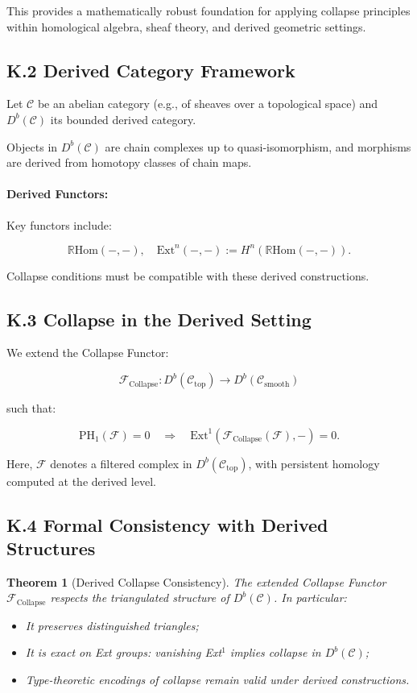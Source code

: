 \documentclass[11pt]{article}
\newtheorem{theorem}{Theorem}[section]
\begin{document}
This provides a mathematically robust foundation for applying collapse principles within homological algebra, sheaf theory, and derived geometric settings.

\subsection*{K.2 Derived Category Framework}

Let \( \mathcal{C} \) be an abelian category (e.g., of sheaves over a topological space) and \( D^b(\mathcal{C}) \) its bounded derived category.

Objects in \( D^b(\mathcal{C}) \) are chain complexes up to quasi-isomorphism, and morphisms are derived from homotopy classes of chain maps.

\paragraph{Derived Functors:}
Key functors include:

\[
\mathbb{R}\mathrm{Hom}(-, -), \quad \mathrm{Ext}^n(-, -) := H^n(\mathbb{R}\mathrm{Hom}(-, -)).
\]

Collapse conditions must be compatible with these derived constructions.

\subsection*{K.3 Collapse in the Derived Setting}

We extend the Collapse Functor:

\[
\mathcal{F}_{\mathrm{Collapse}} : D^b(\mathcal{C}_{\mathrm{top}}) \to D^b(\mathcal{C}_{\mathrm{smooth}})
\]

such that:

\[
\mathrm{PH}_1(\mathcal{F}) = 0 \quad \Rightarrow \quad \mathrm{Ext}^1(\mathcal{F}_{\mathrm{Collapse}}(\mathcal{F}), -) = 0.
\]

Here, \( \mathcal{F} \) denotes a filtered complex in \( D^b(\mathcal{C}_{\mathrm{top}}) \), with persistent homology computed at the derived level.

\subsection*{K.4 Formal Consistency with Derived Structures}

\begin{theorem}[Derived Collapse Consistency]
The extended Collapse Functor \( \mathcal{F}_{\mathrm{Collapse}} \) respects the triangulated structure of \( D^b(\mathcal{C}) \). In particular:

\begin{itemize}
    \item It preserves distinguished triangles;
    \item It is exact on Ext groups: vanishing Ext$^1$ implies collapse in \( D^b(\mathcal{C}) \);
    \item Type-theoretic encodings of collapse remain valid under derived constructions.
\end{itemize}
\end{theorem}
\end{document}
